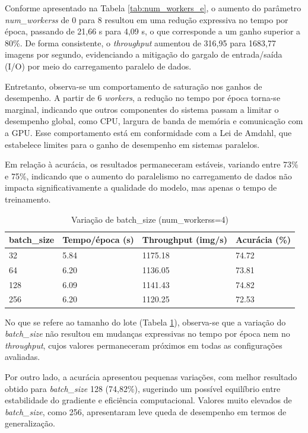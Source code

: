 \documentclass[a4paper,11pt]{article}
\begin{document}
Conforme apresentado na Tabela \ref{tab:num_workers_e}, o aumento do parâmetro \textit{num\_workerss} de 0 para 8 resultou em uma redução expressiva no tempo por época, passando de 21,66 s para 4,09 s, o que corresponde a um ganho superior a 80\%. De forma consistente, o \textit{throughput} aumentou de 316,95 para 1683,77 imagens por segundo, evidenciando a mitigação do gargalo de entrada/saída (I/O) por meio do carregamento paralelo de dados.

Entretanto, observa-se um comportamento de saturação nos ganhos de desempenho. A partir de 6 \textit{workers}, a redução no tempo por época torna-se marginal, indicando que outros componentes do sistema passam a limitar o desempenho global, como CPU, largura de banda de memória e comunicação com a GPU. Esse comportamento está em conformidade com a Lei de Amdahl, que estabelece limites para o ganho de desempenho em sistemas paralelos.

Em relação à acurácia, os resultados permaneceram estáveis, variando entre 73\% e 75\%, indicando que o aumento do paralelismo no carregamento de dados não impacta significativamente a qualidade do modelo, mas apenas o tempo de treinamento.


\begin{table}[H]
\centering
\begin{tabular}{|l|l|l|l|}
\hline
batch\_size & Tempo/época (s) & Throughput (img/s) & Acurácia (\%) \\ \hline
32          & 5.84            &   1175.18          &  74.72       \\ \hline
64          & 6.20            &   1136.05          &  73.81       \\ \hline
128         & 6.09            &   1141.43          &  74.82       \\ \hline
256         & 6.20            &   1120.25          &  72.53       \\ \hline
\end{tabular}
\caption{Variação de batch\_size (num\_workerss=4)}
\label{tab:batch_size_e}
\end{table}

No que se refere ao tamanho do lote (Tabela \ref{tab:batch_size_e}), observa-se que a variação do \textit{batch\_size} não resultou em mudanças expressivas no tempo por época nem no \textit{throughput}, cujos valores permaneceram próximos em todas as configurações avaliadas.

Por outro lado, a acurácia apresentou pequenas variações, com melhor resultado obtido para \textit{batch\_size} 128 (74,82\%), sugerindo um possível equilíbrio entre estabilidade do gradiente e eficiência computacional. Valores muito elevados de \textit{batch\_size}, como 256, apresentaram leve queda de desempenho em termos de generalização.
\end{document}
